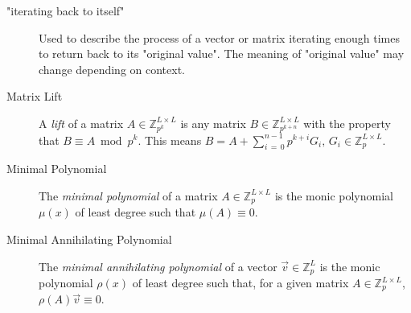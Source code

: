 \documentclass[a4paper, reqno, 12pt]{amsart}
\begin{document}
\begin{description}
				\item["iterating back to itself"] Used to describe the process of a vector or matrix iterating enough times to return back to its "original value". The 
				meaning of "original value" may change depending on context.
				
				\item[Matrix Lift] A \emph{lift} of a matrix $A \in \mathds{Z}_{p^k}^{L \times L}$ is any matrix $B \in \mathds{Z}_{p^{k+n}}^{L \times L}$ with the property
				that $B \equiv A \bmod{p^k}$. This means $B = A + \sum_{i\,=\,0}^{n-1} p^{k+i}G_i, \, G_i \in \mathds{Z}_{p}^{L \times L}$.
				
				\item[Minimal Polynomial] The \emph{minimal polynomial} of a matrix $A \in \mathds{Z}_{p}^{L \times L}$ is the monic polynomial $\mu(x)$ of least degree such 
				that $\mu(A) \equiv 0$. 
			
				\item[Minimal Annihilating Polynomial] The \emph{minimal annihilating polynomial} of a vector $\vec{v} \in \mathds{Z}_{p}^{L}$ is the monic polynomial $\rho(
				x)$ of least degree such that, for a given matrix $A \in \mathds{Z}_{p}^{L \times L}$, $\rho(A)\vec{v} \equiv 0$.
			\end{description}
			
\end{document}
